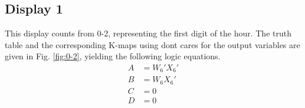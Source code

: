 \subsection{Display 1}
This display counts from 0-2, representing the first digit of the hour. 
The truth table 
and the corresponding K-maps using dont cares for the output variables are given in 
Fig. \ref{fig:0-2},
yielding the following logic equations.
\begin{align}
    A &= W_6' X_6' \\
    B &= W_6 X_6' \\
    C &= 0 \\
    D &= 0 
\end{align}
%

